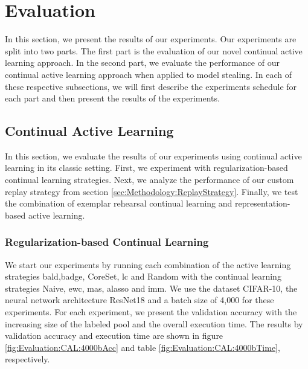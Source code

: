 
\chapter{Evaluation}
\label{ch:Evaluation}

In this section, we present the results of our experiments. Our experiments are split into two parts. The first part is the evaluation of our novel
continual active learning approach. In the second part, we evaluate the performance of our continual active learning approach when applied to model stealing.
In each of these respective subsections, we will first describe the experiments schedule for each part and then present the results of the experiments.



\section{Continual Active Learning}
\label{sec:CAL}
In this section, we evaluate the results of our experiments using continual active learning in its classic setting. First, we experiment with regularization-based
continual learning strategies. Next, we analyze the performance of our custom replay strategy from section \ref{sec:Methodology:ReplayStrategy}. Finally, we
test the combination of exemplar rehearsal continual learning and representation-based active learning.

\subsection{Regularization-based Continual Learning}
\label{sec:Evaluation:CAL:ALRegCL}
We start our experiments by running each combination of the active learning strategies \gls{bald},\gls{badge}, CoreSet, \gls{lc} and Random with the continual learning
strategies Naive, \gls{ewc}, \gls{mas}, \gls{alasso} and \gls{imm}. We use the dataset CIFAR-10, the neural network architecture ResNet18 and a batch size of 4,000 for
these experiments. For each experiment, we present the validation accuracy with the increasing size of the labeled pool and the overall execution time.
The results by validation accuracy and execution time are shown in figure \ref{fig:Evaluation:CAL:4000bAcc} and table \ref{fig:Evaluation:CAL:4000bTime}, respectively.\par

